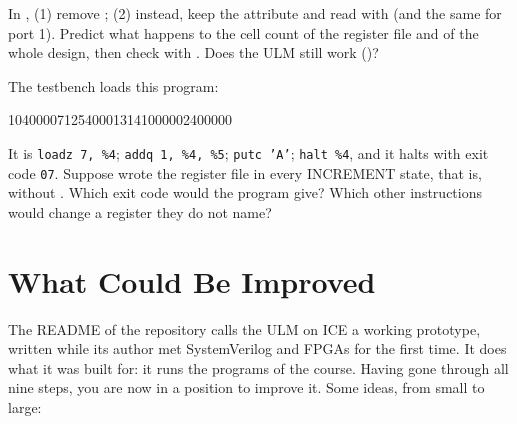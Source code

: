 \begin{exercise}
\label{ex:step09-rf}
In , (1) remove ; (2) instead, keep
the attribute and read with  (and the same for port 1). Predict what happens to the cell count of the
register file and of the whole design, then check with . Does
the ULM still work ()?
\end{exercise}

\begin{exercise}
\label{ex:step09-putc}
The testbench loads this program:
\begin{terminal}
10400007125400013141000002400000
\end{terminal}
It is \texttt{loadz 7, \%4}; \texttt{addq 1, \%4, \%5}; \texttt{putc 'A'};
\texttt{halt \%4}, and it halts with exit code \texttt{07}. Suppose
 wrote the register file in every INCREMENT state, that is,
without . Which exit code would the program give? Which
other instructions would change a register they do not name?
\end{exercise}

\section{What Could Be Improved}
\label{sec:step09-outlook}

The README of the repository calls the ULM on ICE a working prototype, written
while its author met SystemVerilog and FPGAs for the first time. It does what
it was built for: it runs the programs of the course. Having gone through all
nine steps, you are now in a position to improve it. Some ideas, from small to
large:

